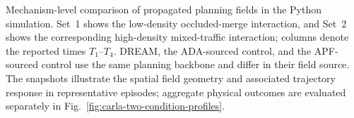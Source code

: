 \caption{Mechanism-level comparison of propagated planning fields in the
Python simulation.  Set~1 shows the low-density occluded-merge interaction,
and Set~2 shows the corresponding high-density mixed-traffic interaction;
columns denote the reported times $T_1$--$T_4$.  DREAM, the ADA-sourced
control, and the APF-sourced control use the same planning backbone and differ
in their field source.  The snapshots illustrate the spatial field geometry
and associated trajectory response in representative episodes; aggregate
physical outcomes are evaluated separately in Fig.~\ref{fig:carla-two-condition-profiles}.}
